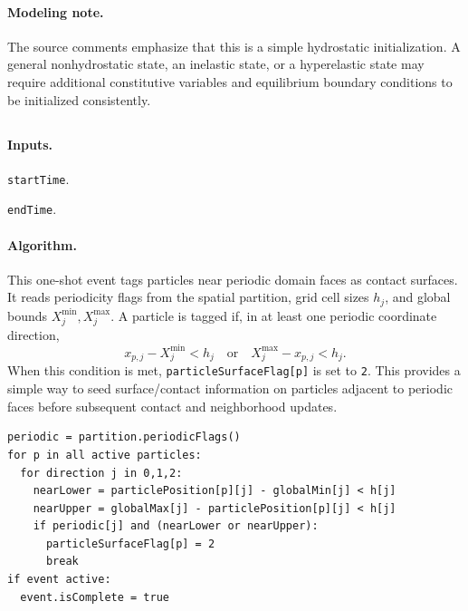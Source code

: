 \paragraph{Modeling note.}
The source comments emphasize that this is a simple hydrostatic initialization.  A general nonhydrostatic state, an inelastic state, or a hyperelastic state may require additional constitutive variables and equilibrium boundary conditions to be initialized consistently.

\subsection{}
\label{subsec:event-insert-periodic-contact-surfaces}

\paragraph{Inputs.}
\begin{description}[leftmargin=*,style=nextline]
\item[\textbf{Required.}] \texttt{startTime}.
\item[\textbf{Optional.}] \texttt{endTime}.
\end{description}

\paragraph{Algorithm.}
This one-shot event tags particles near periodic domain faces as contact surfaces.  It reads periodicity flags from the spatial partition, grid cell sizes $h_j$, and global bounds $X_j^{\min},X_j^{\max}$.  A particle is tagged if, in at least one periodic coordinate direction,
\begin{equation}
  x_{p,j}-X_j^{\min}<h_j
  \quad\text{or}\quad
  X_j^{\max}-x_{p,j}<h_j.
\end{equation}
When this condition is met, \texttt{particleSurfaceFlag[p]} is set to \texttt{2}.  This provides a simple way to seed surface/contact information on particles adjacent to periodic faces before subsequent contact and neighborhood updates.

\begin{lstlisting}[caption={InsertPeriodicContactSurfaces event pseudocode.}]
periodic = partition.periodicFlags()
for p in all active particles:
  for direction j in 0,1,2:
    nearLower = particlePosition[p][j] - globalMin[j] < h[j]
    nearUpper = globalMax[j] - particlePosition[p][j] < h[j]
    if periodic[j] and (nearLower or nearUpper):
      particleSurfaceFlag[p] = 2
      break
if event active:
  event.isComplete = true
\end{lstlisting}

